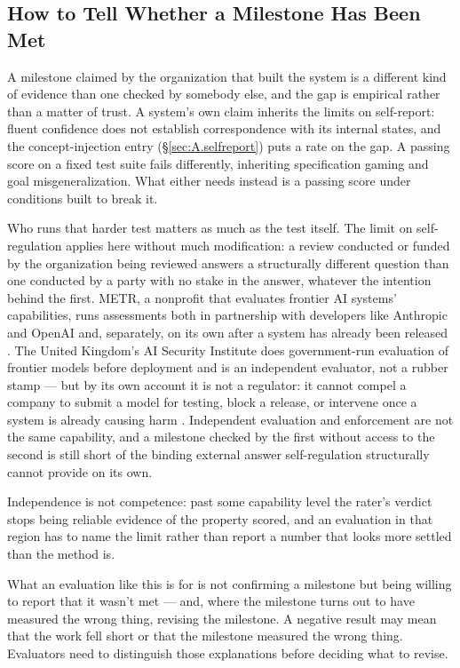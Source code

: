 \subsection{How to Tell Whether a Milestone Has Been Met}
\label{sec:whether-milestone}
A milestone claimed by the organization that built the system is a different kind of evidence than one checked by somebody else, and the gap is empirical rather than a matter of trust. A system's own claim inherits the limits on self-report: fluent confidence does not establish correspondence with its internal states, and the concept-injection entry (§\ref{sec:A.selfreport}) puts a rate on the gap. A passing score on a fixed test suite fails differently, inheriting specification gaming and goal misgeneralization. What either needs instead is a passing score under conditions built to break it.

Who runs that harder test matters as much as the test itself. The limit on self-regulation applies here without much modification: a review conducted or funded by the organization being reviewed answers a structurally different question than one conducted by a party with no stake in the answer, whatever the intention behind the first. METR, a nonprofit that evaluates frontier AI systems' capabilities, runs assessments both in partnership with developers like Anthropic and OpenAI and, separately, on its own after a system has already been released \autocite{metr2026about}. The United Kingdom's AI Security Institute does government-run evaluation of frontier models before deployment and is an independent evaluator, not a rubber stamp — but by its own account it is not a regulator: it cannot compel a company to submit a model for testing, block a release, or intervene once a system is already causing harm \autocite{aisi2025governance}. Independent evaluation and enforcement are not the same capability, and a milestone checked by the first without access to the second is still short of the binding external answer self-regulation structurally cannot provide on its own.

Independence is not competence: past some capability level the rater's verdict stops being reliable evidence of the property scored, and an evaluation in that region has to name the limit rather than report a number that looks more settled than the method is.

What an evaluation like this is for is not confirming a milestone but being willing to report that it wasn't met — and, where the milestone turns out to have measured the wrong thing, revising the milestone. A negative result may mean that the work fell short or that the milestone measured the wrong thing. Evaluators need to distinguish those explanations before deciding what to revise. 